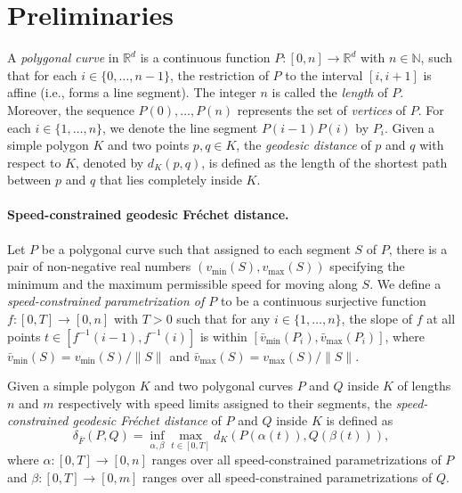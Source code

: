 \documentclass[12pt]{dalthesis}
\newcommand{\IR}{\ensuremath{\mathbb{R}}}
\newcommand{\IN}{\ensuremath{\mathbb{N}}}
\newcommand{\set}[1]{{\{ #1 \}}}
\newcommand{\REM}[1]{}
\newcommand{\CF}{{\mathscr F}}
\newcommand{\Frechet}{Fr\'echet }
\newcommand{\distFS}{\delta_{\bar{F}}} \newcommand{\distWeakF}{\delta_{\bar{N}}} \newcommand{\distClosedF}{\delta_{\bar{C}}} \newcommand{\distPartialF}{\delta_{\bar{P}}} \newcommand{\distGrpahF}{\delta_{\bar{G}}} \newcommand{\distDisF}{\delta_{dF}} \newcommand{\distGeoF}{\delta_{\hat{F}}} \newcommand{\distHomF}{\delta_{h}} \newcommand{\distC}{\delta_C} \newcommand{\distSetF}{\delta_{\CF}}
\newcommand{\Xmin}[2]{{#1}_{\min}(#2)}
\newcommand{\Xmax}[2]{{#1}_{\max}(#2)}
\newcommand{\umin}[1]{\Xmin{\bar{v}}{#1}}
\newcommand{\umax}[1]{\Xmax{\bar{v}}{#1}}
\newcommand{\vmin}[1]{\Xmin{v}{#1}}
\newcommand{\vmax}[1]{\Xmax{v}{#1}}
\begin{document}
\REM{
The rest of the paper is organized as follows.  
We defines the problem formally in Section~\ref{sec:preliminaries} along with some notations.
Section~\ref{sec:ComputingFreeSpace} describes the structure of the free space 
and presents an algorithm for computing it efficiently. 
In Section \ref{sec:decision}, 
we propose an algorithm to compute our variant of the \Frechet distance. 
}


\section{Preliminaries} 
\label{sec:preliminaries}


A {\em polygonal curve\/} in $\IR^d$ is  a continuous function 
$P:[0,n] \rightarrow \IR^d$ with $n \in \IN$, 
such that for each $i \in \set{0, \ldots, n-1}$,
the restriction of $P$ to the interval $[i, i+1]$ 
is affine (i.e., forms a line segment).
The integer $n$ is called the {\em length\/} of $P$.
Moreover, the sequence ${P(0), \ldots, P(n)}$ represents the set of {\em vertices\/} of $P$.
For each $i \in \set{1, \ldots, n}$, 
we denote the line segment $P(i-1)P(i)$ by $P_i$. 
Given a simple polygon $K$ and two points $p,q \in K$,
the \emph{geodesic distance} of $p$ and $q$ with respect to $K$,
denoted by $d_K(p,q)$,
is defined as the length of the shortest path between $p$ and $q$
that lies completely inside $K$.


\paragraph{Speed-constrained geodesic \Frechet distance.}
Let $P$ be a polygonal curve such that
assigned to each segment $S$ of $P$,
there is a pair of non-negative real numbers $(\vmin{S}, \vmax{S})$ 
specifying the minimum and the maximum permissible speed for moving along $S$.
We define a {\em speed-constrained parametrization of $P$\/}
to be a continuous surjective function $f: [0,T] \rightarrow [0,n]$ with $T > 0$
such that for any $i \in \set{1, \ldots, n}$,
the slope of $f$ at all points $t \in [f^{-1}(i-1),f^{-1}(i)]$ is within $[\umin{P_i}, \umax{P_i}]$, where
$\umin{S} = {\vmin{S} / \|S\|}$ and $\umax{S} = {\vmax{S} / \|S\|}$.

Given a simple polygon $K$
and two polygonal curves $P$ and $Q$ inside $K$
of lengths $n$ and $m$ respectively 
with speed limits assigned to their segments, 
the {\em speed-constrained geodesic \Frechet distance\/} of $P$ and $Q$ inside $K$
is defined as
\[
	\distFS(P,Q) = \inf_{\alpha, \beta} \max_{t \in [0,T]} d_K( P(\alpha(t)), Q(\beta(t)) ),
\]
where $\alpha: [0,T] \rightarrow [0,n]$ ranges over all speed-constrained parametrizations of $P$ 
and $\beta:[0,T] \rightarrow [0,m]$ ranges over all speed-constrained parametrizations of $Q$.
\end{document}
